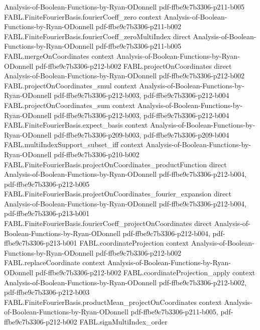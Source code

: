 \begin{theorem}
  {Analysis-of-Boolean-Functions-by-Ryan-ODonnell}
  {pdf-ffbe9c7b3306-p211-b005}
\proofstep
  {FABL.FiniteFourierBasis.fourierCoeff_zero}
  {context}
  {Analysis-of-Boolean-Functions-by-Ryan-ODonnell}
  {pdf-ffbe9c7b3306-p211-b002}
\proofstep
  {FABL.FiniteFourierBasis.fourierCoeff_zeroMultiIndex}
  {direct}
  {Analysis-of-Boolean-Functions-by-Ryan-ODonnell}
  {pdf-ffbe9c7b3306-p211-b005}
\proofstep
  {FABL.mergeOnCoordinates}
  {context}
  {Analysis-of-Boolean-Functions-by-Ryan-ODonnell}
  {pdf-ffbe9c7b3306-p212-b002}
\proofstep
  {FABL.projectOnCoordinates}
  {direct}
  {Analysis-of-Boolean-Functions-by-Ryan-ODonnell}
  {pdf-ffbe9c7b3306-p212-b002}
\proofstep
  {FABL.projectOnCoordinates_smul}
  {context}
  {Analysis-of-Boolean-Functions-by-Ryan-ODonnell}
  {pdf-ffbe9c7b3306-p212-b003,
    pdf-ffbe9c7b3306-p212-b004}
\proofstep
  {FABL.projectOnCoordinates_sum}
  {context}
  {Analysis-of-Boolean-Functions-by-Ryan-ODonnell}
  {pdf-ffbe9c7b3306-p212-b003,
    pdf-ffbe9c7b3306-p212-b004}
\proofstep
  {FABL.FiniteFourierBasis.expect_basis}
  {context}
  {Analysis-of-Boolean-Functions-by-Ryan-ODonnell}
  {pdf-ffbe9c7b3306-p209-b003,
    pdf-ffbe9c7b3306-p209-b004}
\proofstep
  {FABL.multiIndexSupport_subset_iff}
  {context}
  {Analysis-of-Boolean-Functions-by-Ryan-ODonnell}
  {pdf-ffbe9c7b3306-p210-b002}
\proofstep
  {FABL.FiniteFourierBasis.projectOnCoordinates_productFunction}
  {direct}
  {Analysis-of-Boolean-Functions-by-Ryan-ODonnell}
  {pdf-ffbe9c7b3306-p212-b004,
    pdf-ffbe9c7b3306-p212-b005}
\proofstep
  {FABL.FiniteFourierBasis.projectOnCoordinates_fourier_expansion}
  {direct}
  {Analysis-of-Boolean-Functions-by-Ryan-ODonnell}
  {pdf-ffbe9c7b3306-p212-b004,
    pdf-ffbe9c7b3306-p213-b001}
\proofstep
  {FABL.FiniteFourierBasis.fourierCoeff_projectOnCoordinates}
  {direct}
  {Analysis-of-Boolean-Functions-by-Ryan-ODonnell}
  {pdf-ffbe9c7b3306-p212-b004,
    pdf-ffbe9c7b3306-p213-b001}
\proofstep
  {FABL.coordinateProjection}
  {context}
  {Analysis-of-Boolean-Functions-by-Ryan-ODonnell}
  {pdf-ffbe9c7b3306-p212-b002}
\proofstep
  {FABL.replaceCoordinate}
  {context}
  {Analysis-of-Boolean-Functions-by-Ryan-ODonnell}
  {pdf-ffbe9c7b3306-p212-b002}
\proofstep
  {FABL.coordinateProjection_apply}
  {context}
  {Analysis-of-Boolean-Functions-by-Ryan-ODonnell}
  {pdf-ffbe9c7b3306-p212-b002,
    pdf-ffbe9c7b3306-p212-b003}
\proofstep
  {FABL.FiniteFourierBasis.productMean_projectOnCoordinates}
  {context}
  {Analysis-of-Boolean-Functions-by-Ryan-ODonnell}
  {pdf-ffbe9c7b3306-p211-b005,
    pdf-ffbe9c7b3306-p212-b002}
\proofstep
  {FABL.signMultiIndex_order}

\end{theorem}
